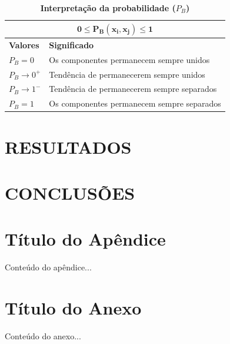 \documentclass[12pt,oneside]{report}
\begin{document}
\begin{table}[H]
    \centering
    \caption{\textbf{Interpretação da probabilidade ($P_B$)}}
    \vspace{0.2cm}
    \begin{tabularx}{\textwidth}{m{3.5cm} X}
        \hline
        \multicolumn{2}{c}{$\mathbf{0 \leq P_B(\mathbf{x}_i, \mathbf{x}_j) \leq 1}$} \\
        \hline
        \textbf{Valores} & \textbf{Significado}                                      \\
        \hline
        $P_B = 0$        & Os componentes permanecem sempre unidos                   \\
        $P_B \to 0^+$    & Tendência de permanecerem sempre unidos                   \\
        $P_B \to 1^-$    & Tendência de permanecerem sempre separados                \\
        $P_B = 1$        & Os componentes permanecem sempre separados                \\
        \hline
    \end{tabularx}

    \vspace{0.2cm}
\end{table}

\chapter{RESULTADOS}

\chapter{CONCLUSÕES}

\printbibliography[title={REFERÊNCIAS},heading=bibnumbered]

\appendix

\chapter{Título do Apêndice}
Conteúdo do apêndice...

\chapter{Título do Anexo}
Conteúdo do anexo...
\end{document}

